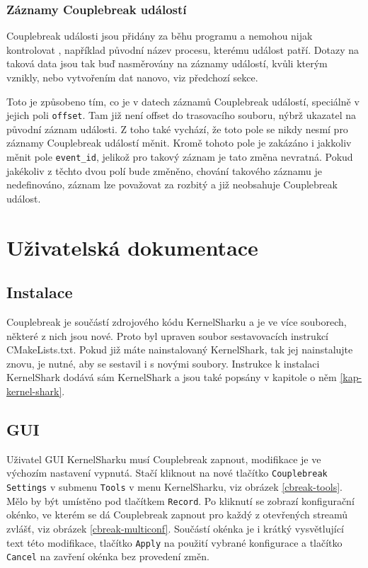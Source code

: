 \subsubsection*{Záznamy Couplebreak událostí}
Couplebreak události jsou přidány za běhu programu a nemohou nijak kontrolovat , například původní název procesu, kterému událost patří. Dotazy na taková data jsou tak buď nasměrovány na záznamy událostí, kvůli kterým vznikly, nebo vytvořením dat nanovo, viz předchozí sekce.

Toto je způsobeno tím, co je v datech záznamů Couplebreak událostí, speciálně v jejich poli \texttt{offset}. Tam již není offset do trasovacího souboru, nýbrž ukazatel na původní záznam události. Z toho také vychází, že toto pole se nikdy nesmí pro záznamy Couplebreak událostí měnit. Kromě tohoto pole je zakázáno i jakkoliv měnit pole \texttt{event\_id}, jelikož pro takový záznam je tato změna nevratná. Pokud jakékoliv z těchto dvou polí bude změněno, chování takového záznamu je nedefinováno, záznam lze považovat za rozbitý a již neobsahuje Couplebreak událost.

\section{Uživatelská dokumentace}

\subsection{Instalace}
Couplebreak je součástí zdrojového kódu KernelSharku a je ve více souborech, některé z nich jsou nové. Proto byl upraven soubor sestavovacích instrukcí CMakeLists.txt. Pokud již máte nainstalovaný KernelShark, tak jej nainstalujte znovu, je nutné, aby se sestavil i s novými soubory. Instrukce k instalaci KernelShark dodává sám KernelShark a jsou také popsány v kapitole o něm \ref{kap-kernel-shark}.

\subsection{GUI}

Uživatel GUI KernelSharku musí Couplebreak zapnout, modifikace je ve výchozím nastavení vypnutá. Stačí kliknout na nové tlačítko \texttt{Couplebreak Settings} v submenu \texttt{Tools} v menu KernelSharku, viz obrázek \ref{cbreak-tools}. Mělo by být umístěno pod tlačítkem \texttt{Record}. Po kliknutí se zobrazí konfigurační okénko, ve kterém se dá Couplebreak zapnout pro každý z otevřených streamů zvlášť, viz obrázek \ref{cbreak-multiconf}. Součástí okénka je i krátký vysvětlující text této modifikace, tlačítko \texttt{Apply} na použití vybrané konfigurace a tlačítko \texttt{Cancel} na zavření okénka bez provedení změn.

